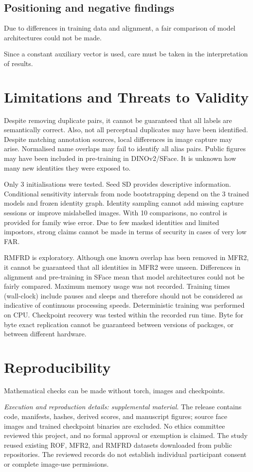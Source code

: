 \documentclass[10pt,lettersize,journal]{IEEEtran}
\begin{document}
\subsection{Positioning and negative findings}
Due to differences in training data and alignment, a fair comparison of model architectures could not be made.\par
Since a constant auxiliary vector is used, care must be taken in the interpretation of results.\par
\section{Limitations and Threats to Validity}
Despite removing duplicate pairs, it cannot be guaranteed that all labels are semantically correct. Also, not all perceptual duplicates may have been identified. Despite matching annotation sources, local differences in image capture may arise. Normalised name overlaps may fail to identify all alias pairs. Public figures may have been included in pre-training in DINOv2/SFace. It is unknown how many new identities they were exposed to.\par
Only 3 initialisations were tested. Seed SD provides descriptive information. Conditional sensitivity intervals from node bootstrapping depend on the 3 trained models and frozen identity graph. Identity sampling cannot add missing capture sessions or improve mislabelled images. With 10 comparisons, no control is provided for family wise error. Due to few masked identities and limited impostors, strong claims cannot be made in terms of security in cases of very low FAR.\par
RMFRD is exploratory. Although one known overlap has been removed in MFR2, it cannot be guaranteed that all identities in MFR2 were unseen. Differences in alignment and pre-training in SFace mean that model architectures could not be fairly compared. Maximum memory usage was not recorded. Training times (wall-clock) include pauses and sleeps and therefore should not be considered as indicative of continuous processing speeds. Deterministic training was performed on CPU. Checkpoint recovery was tested within the recorded run time. Byte for byte exact replication cannot be guaranteed between versions of packages, or between different hardware.\par
\section{Reproducibility}
Mathematical checks can be made without torch, images and checkpoints.\par
\noindent\textit{Execution and reproduction details: supplemental material.}
The release contains code, manifests, hashes, derived scores, and manuscript figures; source face images and trained checkpoint binaries are excluded. No ethics committee reviewed this project, and no formal approval or exemption is claimed. The study reused existing ROF, MFR2, and RMFRD datasets downloaded from public repositories. The reviewed records do not establish individual participant consent or complete image-use permissions.\par
\end{document}
